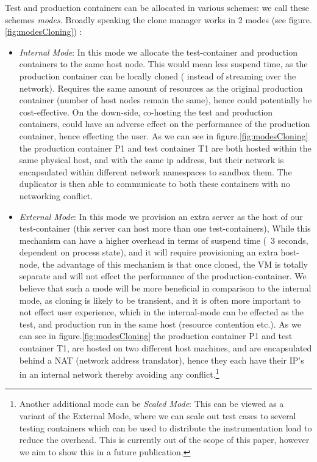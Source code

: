 Test and production containers can be allocated in various schemes: we call these schemes \textit{modes}. 
Broadly speaking the clone manager works in 2 modes (see figure.\ref{fig:modesCloning}) : 
\begin{itemize}[leftmargin=*]

\item \textit{Internal Mode}: In this mode we allocate the test-container and  production containers to the same host node. 
This would mean less suspend time, as the production container can be locally cloned ( instead of streaming over the network). 
Requires the same amount of resources as the original production container (number of host nodes remain the same), hence could potentially be cost-effective.
On the down-side, co-hosting the test and production containers, could have an adverse effect on the performance of the production container, hence effecting the user.
As we can see in figure.\ref{fig:modesCloning} the production container P1 and test container T1 are both hosted within the same physical host, and with the same ip address, but their network is encapsulated within different network namespaces to sandbox them.
The duplicator is then able to communicate to both these containers with no networking conflict.

\item \textit{External Mode}: In this mode we provision an extra server as the host of our test-container (this server can host more than one test-containers), 
While this mechanism can have a higher overhead in terms of suspend time (~3 seconds, dependent on process state), and it will require provisioning an extra host-node, the advantage of this mechanism is that once cloned, the VM is totally separate and will not effect the performance of the production-container.
We believe that such a mode will be more beneficial in comparison to the internal mode, as cloning is likely to be transient, and it is often more important to not effect user experience, which in the internal-mode can be effected as the test, and production run in the same host (resource contention etc.).
As we can see in figure.\ref{fig:modesCloning} the production container P1 and test container T1, are hosted on two different host machines, and are encapsulated behind a NAT\cite{nat} (network address translator), hence they each have their IP's in an internal network thereby avoiding any conflict.\footnote{ Another additional mode can be \textit{Scaled Mode}: This can be viewed as a variant of the External Mode, where we can scale out test cases to several testing containers which can be used to distribute the instrumentation load to reduce the overhead. This is currently out of the scope of this paper, however we aim to show this in a future publication.}

\end{itemize}

